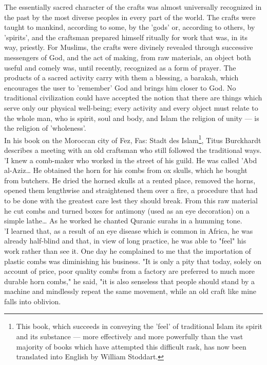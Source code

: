 \documentclass[11pt, b5paper, twoside]{book}
\begin{document}
The essentially sacred character of the crafts was almost universally recognized in the past by the 
most diverse peoples in every part of the world. The crafts were taught to mankind, according to 
some, by the 'gods' or, according to others, by 'spirits', and the craftsman prepared himself 
ritually for work that was, in its way, priestly. For Muslims, the crafts were divinely revealed 
through successive messengers of God, and the act of making, from raw materials, an object both 
useful and comely was, until recently, recognized as a form of prayer. The products of a sacred 
activity carry with them a blessing, a barakah, which encourages the user to 'remember' God and 
brings him closer to God. No traditional civilization could have accepted the notion that there are 
things which serve only our physical well-being; every activity and every object must relate to the 
whole man, who is spirit, soul and body, and Islam the religion of unity --- is the religion of 
'wholeness'. \\

In his book on the Moroccan city of Fez, Fas: Stadt des Islam\footnote{This book, which succeeds in conveying the 'feel' of traditional Islam its spirit and its substance --- more effectively and more powerfully than the vast majority of books which have attempted this 
difficult rask, has now been translated into English by William Stoddart.}, Titus Burckhardt describes a 
meeting with an old craftsman who still followed the traditional ways. 'I knew a comb-maker who 
worked in the street of his guild. He was called 'Abd al-Aziz\ldots{} He obtained the horn for his combs 
from ox skulls, which he bought from butchers. He dried the horned skulls at a rented place, removed 
the horns, opened them lengthwise and straightened them over a fire, a procedure that had to be done 
with the greatest care lest they should break. From this raw material he cut combs and turned boxes 
for antimony (used as an eye decoration) on a simple lathe\ldots{} As he worked he chanted Quranic surahs in a humming tone. \\

'I learned that, as a result of an eye disease which is common in Africa, he was already half-blind 
and that, in view of long practice, he was able to "feel" his work rather than see it. One day he 
complained to me that the importation of plastic combs was diminishing his business. "It is only a 
pity that today, solely on account of price, poor quality combs from a factory are preferred to much 
more durable horn combs," he said, "it is also senseless that people should stand by a machine and 
mindlessly repeat the same movement, while an old craft like mine falls into oblivion. \\
\end{document}
